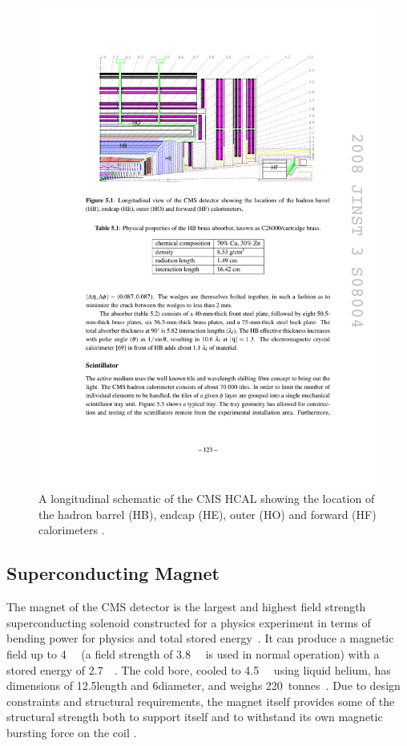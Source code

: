 \begin{figure}[hbtp]
   \centering
     \includegraphics[width=\textwidth]{Chapters/02_Detector/Images/HCAL.pdf}\hfill
     \caption[A longitudinal schematic of the CMS HCAL.]{A longitudinal schematic of the CMS HCAL showing the
     location of the hadron barrel (HB), endcap (HE), outer (HO) and forward (HF) calorimeters
     \cite{CMS_experiment}.}
     \label{fig:CMS_HCAL}
\end{figure} 

\subsection{Superconducting Magnet}
\label{ss:Magnet}
The magnet of the CMS detector is the largest and highest field strength superconducting solenoid constructed
for a physics experiment in terms of bending power for physics and total stored energy~\cite{CMS_experiment}.
It can produce a magnetic field up to 4~\tesla~ (a field strength of 3.8~\tesla~ is used in normal operation)
with a stored energy of 2.7~\giga\joule~\cite{CMS_TDR1}. The cold bore, cooled to 4.5~\kelvin~ using liquid
helium, has dimensions of 12.5\m length and 6\m diameter, and weighs
220~tonnes~\cite{Cryogenic_System_for_Superconducting_Solenoid}.
Due to design constraints and structural requirements, the magnet itself provides some of the structural
strength both to support itself and to withstand its own magnetic bursting force on the coil
\cite{CMS_experiment}.


